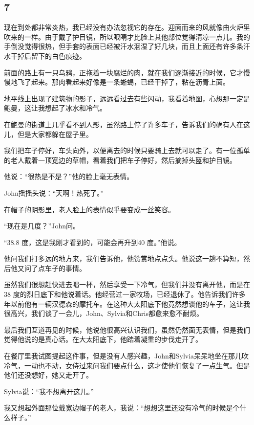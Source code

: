 \documentclass[UTF8]{article}
\begin{document}
\subsection*{7}
\par 现在到处都非常炎热，我已经没有办法忽视它的存在。迎面而来的风就像由火炉里吹来的一样。由于戴了护目镜，所以眼睛才比脸上其他部位觉得清凉一点儿。我的手倒没觉得很热，但手套的表面已经被汗水洇湿了好几块，而且上面还有许多条汗水干掉后留下的白色痕迹。
\par 前面的路上有一只乌鸦，正拖着一块腐烂的肉，就在我们逐渐接近的时候，它才慢慢地飞了起来。那肉看起来好像是一条蜥蜴，已经干掉了，粘在沥青上面。
\par 地平线上出现了建筑物的影子，远远看过去有些闪动，我看着地图，心想那一定是鲍曼，这让我想起了冰水和冷气。
\par 在鲍曼的街道上几乎看不到人影，虽然路上停了许多车子，告诉我们的确有人在这儿，但是大家都躲在屋子里。
\par 我们把车子停好，车头向外，以便离去的时候只要骑上去就可以走了。有一位孤单的老人戴着一顶宽边的草帽，看着我们把车子停好，然后摘掉头盔和护目镜。
\par 他说：“很热是不是？”他的脸上毫无表情。
\par John摇摇头说：“天啊！热死了。”
\par 在帽子的阴影里，老人脸上的表情似乎要变成一丝笑容。
\par “现在是几度？”John问。
\par “38.8 度，这是我刚才看到的，可能会再升到40 度。”他说。
\par 他问我们打多远的地方来，我们告诉他，他赞赏地点点头。他说这一趟不算短，然后他又问了点车子的事情。
\par 虽然我们很想赶快进去喝一杯，然后享受一下冷气，但我们并没有离开他，而是在38 度的烈日底下和他说着话。他经营过一家牧场，已经退休了。他告诉我们许多年以前他有一辆汉德森的摩托车。在这种大太阳底下他竟然想谈他的车子，这让我很高兴，我们谈了一会儿，John、Sylvia和Chris都愈来愈不耐烦。
\par 最后我们互道再见的时候，他说他很高兴认识我们，虽然仍然面无表情，但是我们觉得他说的是真心话。在大太阳底下，他踏着凝重的步伐走开了。
\par 在餐厅里我试图提起这件事，但是没有人感兴趣，John和Sylvia呆呆地坐在那儿吹冷气，一动也不动，女侍过来问我们要点什么，这才使他们恢复了一点生气。但是他们还没想好，她又走开了。
\par Sylvia说：“我不想离开这儿。”
\par 我又想起外面那位戴宽边帽子的老人，我说：“想想这里还没有冷气的时候是个什么样子。”
\end{document}
